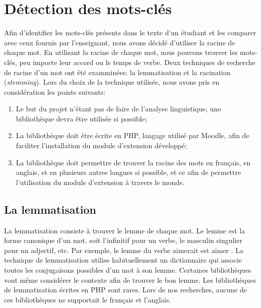 \chapter{D\'etection des mots-cl\'es}
\label{chap:keywords}
Afin d'identifier les mots-cl\'es pr\'esents dans le texte d'un \'etudiant et les comparer avec ceux fournis par l'enseignant, nous avons d\'ecid\'e d'utiliser la racine de chaque mot.
En utilisant la racine de chaque mot, nous pouvons trouver les mots-cl\'es, peu importe leur accord ou le temps de verbe.
Deux techniques de recherche de racine d'un mot ont \'et\'e exammin\'ees: la lemmatisation et la racination (\textit{stemming}).
Lors du choix de la technique utilis\'ee, nous avons pris en consid\'eration les points suivants:
\begin{enumerate}
  \item Le but du projet n'\'etant pas de faire de l'analyse linguistique, une biblioth\`eque devra \^etre utilis\'ee si possible;
  \item La biblioth\`eque doit \^etre \'ecrite en PHP, langage utilis\'e par Moodle, afin de faciliter l'installation du module d'extension d\'evelopp\'e;
  \item La biblioth\`eque doit permettre de trouver la racine des mots en fran\c{c}ais, en anglais, et en plusieurs autres langues si possible, et ce afin de permettre l'utilisation du module d'extension \`a travers le monde.
\end{enumerate}

\section{La lemmatisation}
La lemmatisation consiste \`a trouver le lemme de chaque mot.
Le lemme est la forme canonique d'un mot, soit l'infinitif pour un verbe, le masculin singulier pour un adjectif, etc.
Par exemple, le lemme du verbe \og aimerait \fg{} est \og aimer \fg{}.
La  technique de lemmatisation utilise habituellement un dictionnaire qui associe toutes les conjugaisons possibles d'un mot \`a son lemme.
Certaines biblioth\`eques vont m\^eme consid\'erer le contexte afin de trouver le bon lemme.
Les biblioth\`eques de lemmatisation \'ecrites en PHP sont rares.
Lors de nos recherches, aucune de ces biblioth\`eques ne supportait le fran\c{c}ais et l'anglais.

